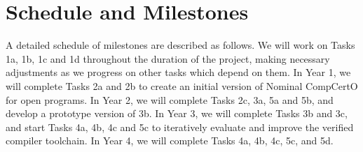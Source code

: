 \section{Schedule and Milestones}

A detailed schedule of milestones are described as follows.
We will work on Tasks 1a, 1b, 1c and 1d throughout the duration of the project,
making necessary adjustments as we progress on other tasks
which depend on them.
In Year 1, 
we will complete Tasks 2a and 2b to
create an initial version of Nominal CompCertO for open programs.
In Year 2, we will complete Tasks 2c, 3a, 5a and 5b, and
develop a prototype version of 3b.
In Year 3, 
we will complete Tasks 3b and 3c, and start Tasks 4a, 4b, 4c and 5c to
iteratively evaluate and improve the verified compiler toolchain.
In Year 4, we will complete Tasks 4a, 4b, 4c, 5c, and 5d.


